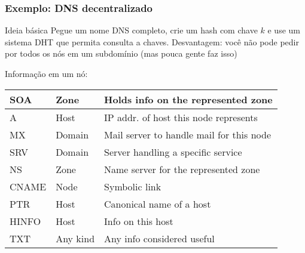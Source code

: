 \documentclass[Ligatures=TeX,table,brazil,svgnames,usetotalslideindicator,compress,10pt]{beamer}
\begin{document}
\begin{frame}
  \frametitle{Exemplo: DNS decentralizado}
  \begin{block}{Ideia básica}
    Pegue um nome DNS completo, crie um hash com chave $k$ e use um sistema DHT que permita consulta a chaves. \alert{Desvantagem:} você não pode pedir por todos os nós em um subdomínio (mas pouca gente faz isso)
  \end{block}

  \begin{block}{Informação em um nó:}
    \footnotesize
    \renewcommand{\arraystretch}{1.2}
    \begin{center}
      \begin{tabular}{|l|l|l|}\hline
        SOA & Zone & Holds info on the represented zone \\ \hline
        A & Host & IP addr. of host this node represents \\ \hline
        MX & Domain & Mail server to handle mail for this node \\ \hline
        SRV & Domain & Server handling a specific service \\ \hline
        NS & Zone & Name server for the represented zone \\ \hline
        CNAME & Node & Symbolic link  \\ \hline
        PTR & Host & Canonical name of a host \\ \hline
        HINFO & Host & Info on this host \\ \hline
        TXT & Any kind & Any info considered useful \\ \hline
      \end{tabular}
    \end{center}

  \end{block}

\end{frame}
\end{document}
